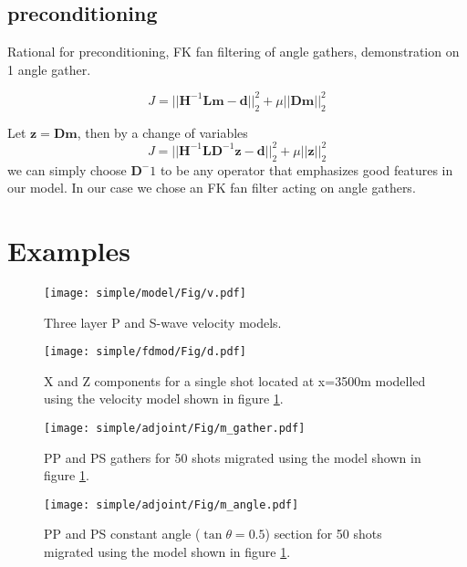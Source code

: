 \subsection{preconditioning}

Rational for preconditioning, FK fan filtering of angle gathers, demonstration on 1 angle gather.

\begin{equation}
J = || \mathbf{H}^{-1}\mathbf{L}\mathbf{m} - \mathbf{d} ||^2_2 + \mu ||\mathbf{D}\mathbf{m}||^2_2
\end{equation}

Let $\mathbf{z}=\mathbf{D}\mathbf{m}$, then by a change of variables
\begin{equation}
J = || \mathbf{H}^{-1}\mathbf{L}\mathbf{D}^{-1}\mathbf{z} - \mathbf{d} ||^2_2 + \mu ||\mathbf{z}||^2_2
\end{equation}
we can simply choose $\mathbf{D}^-1$ to be any operator that emphasizes good features in our model. In our case we chose an FK fan filter acting on angle gathers.

\section{Examples}

\begin{figure}
\centering
\texttt{[image: simple/model/Fig/v.pdf]}
\caption{Three layer P and S-wave velocity models.}
\label{fig:v_simple}
\end{figure}

\begin{figure}
\centering
\texttt{[image: simple/fdmod/Fig/d.pdf]}
\caption{X and Z components for a single shot located at x=3500m modelled using the velocity model shown in figure \ref{fig:v_simple}.}
\label{fig:d_simple}
\end{figure}

\begin{figure}
\centering
\texttt{[image: simple/adjoint/Fig/m\_gather.pdf]}
\caption{PP and PS gathers for 50 shots migrated using the model shown in figure \ref{fig:v_simple}.}
\label{fig:m_gather_simple}
\end{figure}

\begin{figure}
\centering
\texttt{[image: simple/adjoint/Fig/m\_angle.pdf]}
\caption{PP and PS constant angle ($\tan \theta = 0.5$) section for 50 shots migrated using the model shown in figure \ref{fig:v_simple}.}
\label{fig:m_angle_simple}
\end{figure}


